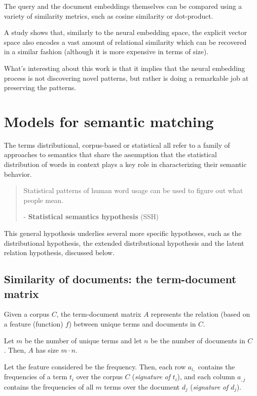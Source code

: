 The query and the document embeddings themselves can be compared using a variety of similarity metrics, such as cosine similarity or dot-product.

A study \cite{ewr} shows that, similarly to the neural embedding space, the explicit vector space also encodes a vast amount of relational similarity which can be recovered in a similar fashion (although it is more expensive in terms of size).

What's interesting about this work is that it implies that the neural embedding process is not discovering novel patterns, but rather is doing a remarkable job at preserving the patterns.

\section{Models for semantic matching}
\label{sec:modelsSemantic}

The terms distributional, corpus-based or statistical all refer to a family of approaches to semantics that share the
assumption that the statistical distribution of words in context plays a key role in characterizing their semantic behavior.

\begin{quote}
Statistical patterns of human word usage can be used to figure out what people
mean.

- \textbf{Statistical semantics hypothesis} (SSH)
\end{quote}

This general hypothesis underlies several more specific hypotheses, such as the distributional hypothesis, the extended distributional hypothesis and the latent relation hypothesis, discussed below.

\subsection{Similarity of documents: the term-document matrix}

Given a corpus $C$, the term-document matrix $A$ represents the relation (based on a feature (function) $f$) between unique terms and documents in $C$.

Let $m$ be the number of unique terms and let $n$ be the number of documents in $C$. Then, $A$ has size $m\cdot n$.

Let the feature considered be the frequency. Then, each row $a_{i,}$ contains
the frequencies of a term $t_i$ over the corpus $C$ (\textit{signature of $t_i$}),
and each column $a_{,j}$ contains the frequencies of all $m$ terms over the document $d_j$ (\textit{signature of $d_j$}).

